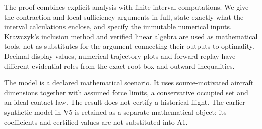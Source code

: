 The proof combines explicit analysis with finite interval computations. We give the contraction and local-sufficiency arguments in full, state exactly what the interval calculations enclose, and specify the immutable numerical inputs. Krawczyk's inclusion method \citep{krawczyk} and verified linear algebra \citep{rump} are used as mathematical tools, not as substitutes for the argument connecting their outputs to optimality. Decimal display values, numerical trajectory plots and forward replay have different evidential roles from the exact root box and outward inequalities.

The model is a declared mathematical scenario. It uses source-motivated aircraft dimensions together with assumed force limits, a conservative occupied set and an ideal contact law. The result does not certify a historical flight. The earlier synthetic model in V5 is retained as a separate mathematical object; its coefficients and certified values are not substituted into A1.
